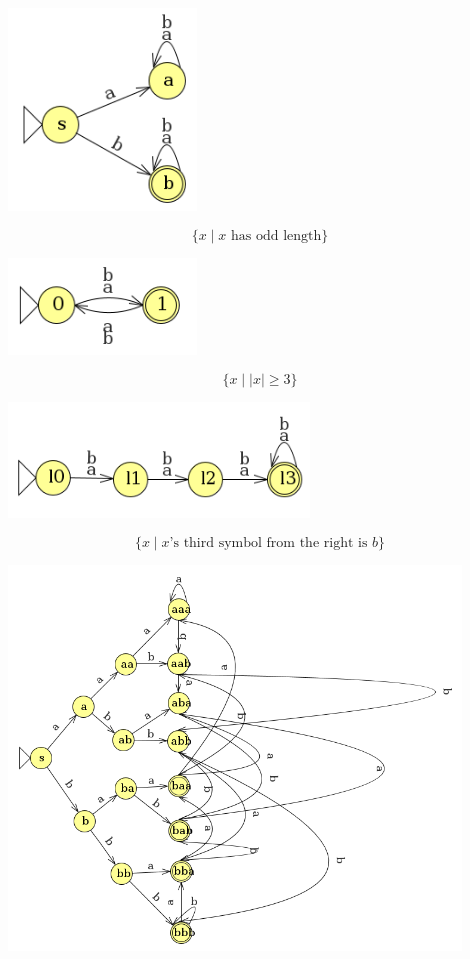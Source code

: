 \documentclass[letterpaper, 12pt]{math}
\begin{document}
\begin{enumerate}
\begin{enumerate}
    \begin{center}
      \includegraphics[width=5cm]{hw_3_5.png}
    \end{center}
    \[ \{x\mid x\text{ has odd length}\} \]
    \begin{center}
      \includegraphics[width=5cm]{hw_3_6.png}
    \end{center}
    \[ \{x\mid|x|\geq3\} \]
    \begin{center}
      \includegraphics[width=8cm]{hw_3_7.png}
    \end{center}
    \[ \{x\mid x\text{'s third symbol from the right is } b\} \]
    \begin{center}
      \includegraphics[width=12cm]{hw_3_8.png}

\end{center}
\end{enumerate}
\end{enumerate}
\end{document}
